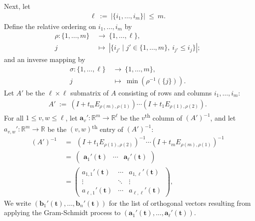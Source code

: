 \documentclass[12pt, reqno, oneside]{amsart}
\numberwithin{equation}{section}
\begin{document}
Next, let 
\begin{align}
\ell \ := \ | \{i_1, \dots, i_m\} | \ \leq \ m.
\end{align}
Define the relative ordering on $i_1, \dots, i_m$ by
\begin{align}
\nonumber
\rho: \{1, \dots, m\} \ & \to \ \{1, \dots, \ell\}, \\
j \ & \mapsto \ \left|\{i_{j'} \mid j' \in \{1, \dots, m\}, \ i_{j'} \leq i_j\}\right|;
\end{align}
and an inverse mapping by
\begin{align}
\nonumber
\sigma: \{1, \dots, \ell\} \ & \to \ \{1, \dots, m\}, \\
j \ & \mapsto \ \min\left(\rho^{-1}(\{j\})\right).
\end{align}
Let $A'$ be the $\ell \times \ell$ submatrix of $A$ consisting of rows and columns $i_1, \dots, i_m$:
\begin{align}
A' \ := \ (I+t_mE_{\rho(m),\rho(1)}) \cdots (I+t_1E_{\rho(1),\rho(2)}).
\end{align}
For all $1 \leq v, w \leq \ell$, let $\mathbf{a}_v' : \mathbb{R}^m \to \mathbb{R}^\ell$ be the $v$\textsuperscript{th} column of $(A')^{-1}$, and let $a_{v,w}' : \mathbb{R}^m \to \mathbb{R}$ be the $(v,w)$\textsuperscript{th} entry of $(A')^{-1}$:
\begin{align}
\nonumber
(A')^{-1} \ &= \ \ (I+t_1E_{\rho(1),\rho(2)})^{-1} \cdots (I+t_mE_{\rho(m),\rho(1)})^{-1} \\
\nonumber
& = \ 
\begin{pmatrix}
\mathbf{a}_1'(\mathbf{t}) & \cdots & \mathbf{a}_\ell'(\mathbf{t})
\end{pmatrix} \\
\label{eq:matrixA'}
& = 
\begin{pmatrix}
a_{1,1}'(\mathbf{t}) & \cdots & a_{1,\ell}'(\mathbf{t}) \\
\vdots & \ddots & \vdots \\
a_{\ell,1}'(\mathbf{t}) & \cdots & a_{\ell,\ell}'(\mathbf{t})
\end{pmatrix},
\end{align} 
We write $(\mathbf{b}_1'(\mathbf{t}),\dots,\mathbf{b}_n'(\mathbf{t}))$ for the list of orthogonal vectors resulting from applying the Gram-Schmidt process to $(\mathbf{a}_1'(\mathbf{t}),\dots,\mathbf{a}_\ell'(\mathbf{t}))$.
\end{document}
